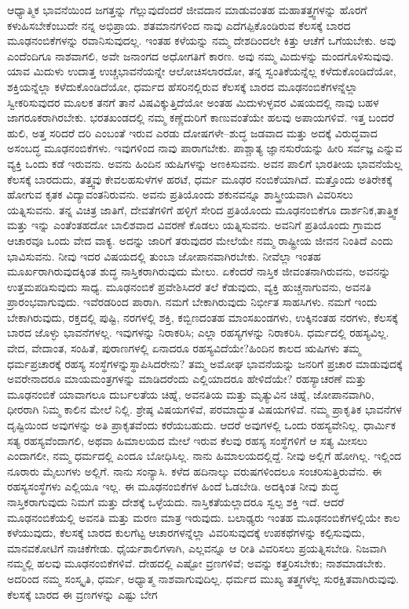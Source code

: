 ಆಧ್ಯಾತ್ಮಿಕ ಭಾವನೆಯಿಂದ ಜಗತ್ತನ್ನು ಗೆಲ್ಲುವುದೆಂದರೆ ಜೀವದಾನ ಮಾಡುವಂತಹ ಮಹಾತತ್ತ್ವಗಳನ್ನು ಹೊರಗೆ ಕಳುಹಿಸಬೇಕೆಂಬುದೇ ನನ್ನ ಅಭಿಪ್ರಾಯ. ಶತಮಾನಗಳಿಂದ ನಾವು ಎದೆಗಪ್ಪಿಕೊಂಡಿರುವ ಕೆಲಸಕ್ಕೆ ಬಾರದ ಮೂಢನಂಬಿಕೆ\-ಗಳನ್ನು ರವಾನಿಸುವುದಲ್ಲ. ಇಂತಹ ಕಳೆಯನ್ನು ನಮ್ಮ ದೇಶದಿಂದಲೇ ಕಿತ್ತು ಆಚೆಗೆ ಒಗೆಯಬೇಕು. ಅವು ಎಂದೆಂದಿಗೂ ನಾಶವಾಗಲಿ, ಅವೇ ಜನಾಂಗದ ಅಧೋಗತಿಗೆ ಕಾರಣ. ಅವು ನಮ್ಮ ಮಿದುಳನ್ನು ಮಂದಗೊಳಿಸುವುವು. ಯಾವ ಮಿದುಳು ಉದಾತ್ತ ಉಚ್ಚಭಾವನೆಯನ್ನೇ ಆಲೋಚಿಸಲಾರದೋ, ತನ್ನ ಸ್ವಂತಿಕೆಯನ್ನೆಲ್ಲ ಕಳೆದುಕೊಂಡಿದೆಯೋ, ಶಕ್ತಿಯನ್ನೆಲ್ಲಾ ಕಳೆದುಕೊಂಡಿದೆಯೋ, ಧರ್ಮದ ಹೆಸರಿನಲ್ಲಿರುವ ಕೆಲಸಕ್ಕೆ ಬಾರದ ಮೂಢನಂಬಿಕೆಗಳನ್ನೆಲ್ಲಾ ಸ್ವೀಕರಿಸುವುದರ ಮೂಲಕ ತನಗೆ ತಾನೆ ವಿಷವಿಕ್ಕುತ್ತಿದೆಯೋ ಅಂತಹ ಮಿದುಳುಳ್ಳವರ ವಿಷಯದಲ್ಲಿ ನಾವು ಬಹಳ ಜಾಗರೂಕರಾಗಿರಬೇಕು. ಭರತಖಂಡದಲ್ಲಿ ನಮ್ಮ ಕಣ್ಣೆದುರಿಗೆ ಕಾಣುವಂತೆಯೇ ಹಲವು ಅಪಾಯಗಳಿವೆ. ಇತ್ತ ಬಂದರೆ ಹುಲಿ, ಅತ್ತ ಸರಿದರೆ ದರಿ ಎಂಬಂತೆ ಇರುವ ಎರಡು ದೋಷಗಳೇ–ಶುದ್ಧ ಜಡವಾದ ಮತ್ತು ಅದಕ್ಕೆ ವಿರುದ್ಧವಾದ ಅಸಂಬದ್ಧ ಮೂಢನಂಬಿಕೆಗಳು. ಇವುಗಳಿಂದ ನಾವು ಪಾರಾಗಬೇಕು. ಪಾಶ್ಚಾತ್ಯ ಜ್ಞಾನಸುರೆಯನ್ನು ಹೀರಿ ಸರ್ವಜ್ಞ ಎನ್ನುವ ವ್ಯಕ್ತಿ ಒಂದು ಕಡೆ ಇರುವನು. ಅವನು ಹಿಂದಿನ ಋಷಿಗಳನ್ನು ಅಣಕಿಸುವನು. ಅವನ ಪಾಲಿಗೆ ಭಾರತೀಯ ಭಾವನೆಯೆಲ್ಲ ಕೆಲಸಕ್ಕೆ ಬಾರದುದು, ತತ್ತ್ವವು ಕೇವಲ\break ಹಸುಳೆಗಳ ಹರಟೆ, ಧರ್ಮ ಮೂಢರ ನಂಬಿಕೆಯಾಗಿದೆ. ಮತ್ತೊಂದು ಅತಿರೇಕಕ್ಕೆ ಹೋಗುವ ಕೃತಕ ವಿದ್ಯಾವಂತನಿರುವನು. ಅವನು ಪ್ರತಿಯೊಂದು ಶಕುನ\-ವನ್ನೂ ಶಾಸ್ತ್ರೀಯವಾಗಿ ವಿವರಿಸಲು ಯತ್ನಿಸುವನು. ತನ್ನ ವಿಚಿತ್ರ ಜಾತಿಗೆ, ದೇವತೆಗಳಿಗೆ ಹಳ್ಳಿಗೆ ಸೇರಿದ ಪ್ರತಿಯೊಂದು ಮೂಢನಂಬಿಕೆಗೂ ದಾರ್ಶನಿಕ,\break ತಾತ್ತ್ವಿಕ ಮತ್ತು ಇನ್ನು ಎಂತೆಂತಹದೋ ಬಾಲಿಶವಾದ ವಿವರಣೆ ಕೊಡಲು ಯತ್ನಿಸು\-ವನು. ಅವನಿಗೆ ಪ್ರತಿಯೊಂದು ಗ್ರಾಮದ ಆಚಾರವೂ ಒಂದು ವೇದ ವಾಕ್ಯ. ಅದನ್ನು ಜಾರಿಗೆ ತರುವುದರ ಮೇಲೆಯೇ ನಮ್ಮ ರಾಷ್ಟ್ರೀಯ ಜೀವನ ನಿಂತಿದೆ ಎಂದು ಭಾವಿಸುವನು. ನೀವು ಇದರ ವಿಷಯದಲ್ಲಿ ತುಂಬಾ ಜೋಪಾನವಾಗಿರಬೇಕು. ನೀವೆಲ್ಲಾ ಇಂತಹ ಮೂರ್ಖರಾಗಿರುವುದಕ್ಕಿಂತ ಶುದ್ಧ ನಾಸ್ತಿಕ\-ರಾಗಿರುವುದು ಮೇಲು. ಏಕೆಂದರೆ ನಾಸ್ತಿಕ ಜೀವಂತನಾಗಿರುವನು, ಅವನನ್ನು ಉತ್ತಮಪಡಿಸುವುದು ಸಾಧ್ಯ. ಮೂಢನಂಬಿಕೆ ಪ್ರವೇಶಿಸಿದರೆ ತಲೆ ಕೆಡುವುದು, ವ್ಯಕ್ತಿ ಹುಚ್ಚನಾಗುವನು, ಅವನತಿ ಪ್ರಾರಂಭವಾಗುವುದು. ಇವೆರಡರಿಂದ ಪಾರಾಗಿ. ನಮಗೆ ಬೇಕಾಗಿರುವುದು ನಿರ್ಭೀತ ಸಾಹಸಿಗಳು. ನಮಗೆ ಇಂದು ಬೇಕಾಗಿರುವುದು, ರಕ್ತದಲ್ಲಿ ಪುಷ್ಟಿ, ನರಗಳಲ್ಲಿ ಶಕ್ತಿ, ಕಬ್ಬಿಣದಂತಹ ಮಾಂಸಖಂಡಗಳು, ಉಕ್ಕಿನಂತಹ ನರಗಳು, ಕೆಲಸಕ್ಕೆ ಬಾರದ ಜೊಳ್ಳು ಭಾವನೆಗಳಲ್ಲ. ಇವುಗಳನ್ನು ನಿರಾಕರಿಸಿ; ಎಲ್ಲಾ ರಹಸ್ಯಗಳನ್ನು ನಿರಾಕರಿಸಿ. ಧರ್ಮದಲ್ಲಿ ರಹಸ್ಯವಿಲ್ಲ. ವೇದ, ವೇದಾಂತ, ಸಂಹಿತೆ, ಪುರಾಣಗಳಲ್ಲಿ ಏನಾದರೂ ರಹಸ್ಯವಿದೆಯೇ?\break ಹಿಂದಿನ ಕಾಲದ ಋಷಿಗಳು ತಮ್ಮ ಧರ್ಮಪ್ರಚಾರಕ್ಕೆ ರಹಸ್ಯ ಸಂಸ್ಥೆಗಳನ್ನು\break ಸ್ಥಾಪಿಸಿದರೇನು? ತಮ್ಮ ಅಮೋಘ ಭಾವನೆಯನ್ನು ಜನರಿಗೆ ಪ್ರಚಾರ ಮಾಡುವುದಕ್ಕೆ ಅವರೇನಾದರೂ ಮಾಯಮಂತ್ರಗಳನ್ನು ಮಾಡಿದರೆಂದು ಎಲ್ಲಿಯಾದರೂ ಹೇಳಿದೆಯೇ? ರಹಸ್ಯಾಚರಣೆ ಮತ್ತು ಮೂಢನಂಬಿಕೆ ಯಾವಾಗಲೂ ದುರ್ಬಲತೆಯ ಚಿಹ್ನೆ, ಅವನತಿಯ ಮತ್ತು ಮೃತ್ಯುವಿನ ಚಿಹ್ನೆ, ಜೋಪಾನವಾಗಿರಿ, ಧೀರರಾಗಿ ನಿಮ್ಮ ಕಾಲಿನ ಮೇಲೆ ನಿಲ್ಲಿ. ಶ್ರೇಷ್ಠ ವಿಷಯಗಳಿವೆ, ಪರಮಾದ್ಭುತ ವಿಷಯಗಳಿವೆ. ನಮ್ಮ ಪ್ರಾಕೃತಿಕ ಭಾವನೆಗಳ ದೃಷ್ಟಿಯಿಂದ ಅವುಗಳನ್ನು ಅತಿ ಪ್ರಾಕೃತವೆಂದು ಕರೆಯಬಹುದು. ಆದರೆ ಅವುಗಳಲ್ಲಿ ಒಂದು ರಹಸ್ಯವೇನಿಲ್ಲ. ಧಾರ್ಮಿಕ ಸತ್ಯ ರಹಸ್ಯವೆಂದಾಗಲಿ, ಅಥವಾ ಹಿಮಾಲಯದ ಮೇಲೆ ಇರುವ ಕೆಲವು ರಹಸ್ಯ ಸಂಸ್ಥೆಗಳಿಗೆ ಆ ಸತ್ಯ ಮೀಸಲು ಎಂದಾಗಲೀ, ನಮ್ಮ ಧರ್ಮದಲ್ಲಿ ಎಂದೂ ಬೋಧಿಸಿಲ್ಲ. ನಾನು ಹಿಮಾಲಯದಲ್ಲಿದ್ದೆ. ನೀವು ಅಲ್ಲಿಗೆ ಹೋಗಿಲ್ಲ. ಇಲ್ಲಿಂದ ನೂರಾರು ಮೈಲುಗಳು ಅಲ್ಲಿಗೆ. ನಾನು ಸಂನ್ಯಾಸಿ. ಕಳೆದ ಹದಿನಾಲ್ಕು ವರುಷಗಳಿಂದಲೂ ಸಂಚರಿಸುತ್ತಿರುವೆನು. ಈ ರಹಸ್ಯಸಂಸ್ಥೆಗಳು ಎಲ್ಲಿಯೂ ಇಲ್ಲ. ಈ ಮೂಢನಂಬಿಕೆಗಳ ಹಿಂದೆ ಓಡಬೇಡಿ. ಅದಕ್ಕಿಂತ ನೀವು ಶುದ್ಧ ನಾಸ್ತಿಕರಾಗುವುದು ನಿಮಗೆ ಮತ್ತು ದೇಶಕ್ಕೆ ಒಳ್ಳೆಯದು. ನಾಸ್ತಿಕತೆಯಲ್ಲಾದರೂ ಸ್ವಲ್ಪ ಶಕ್ತಿ ಇದೆ. ಆದರೆ ಮೂಢನಂಬಿಕೆಯಲ್ಲಿ ಅವನತಿ ಮತ್ತು ಮರಣ ಮಾತ್ರ ಇರುವುದು. ಬಲಾಢ್ಯರು ಇಂತಹ ಮೂಢನಂಬಿಕೆಗಳಲ್ಲಿಯೇ ಕಾಲ ಕಳೆಯುವುದು, ಕೆಲಸಕ್ಕೆ ಬಾರದ ಕುಲಗೆಟ್ಟ ಆಚಾರಗಳನ್ನೆಲ್ಲಾ ವಿವರಿಸುವುದಕ್ಕೆ ಉಪಕಥೆಗಳನ್ನು ಕಲ್ಪಿಸುವುದು, ಮಾನವಕೋಟಿಗೆ ನಾಚಿಕೆಗೇಡು. ಧೈರ್ಯಶಾಲಿಗಳಾಗಿ, ಎಲ್ಲವನ್ನೂ ಆ ರೀತಿ ವಿವರಿಸಲು ಪ್ರಯತ್ನಿಸಬೇಡಿ. ನಿಜವಾಗಿ ನಮ್ಮಲ್ಲಿ ಹಲವು ಮೂಢನಂಬಿಕೆಗಳಿವೆ. ದೇಹದಲ್ಲಿ ಎಷ್ಟೋ ವ್ರಣಗಳಿವೆ; ಅವನ್ನು ಕತ್ತರಿಸಬೇಕು; ನಾಶಮಾಡಬೇಕು. ಅದರಿಂದ ನಮ್ಮ ಸಂಸ್ಕೃತಿ, ಧರ್ಮ, ಅಧ್ಯಾತ್ಮ ನಾಶವಾಗುವುದಿಲ್ಲ. ಧರ್ಮದ ಮುಖ್ಯ ತತ್ತ್ವಗಳೆಲ್ಲ ಸುರಕ್ಷಿತವಾಗಿರುವುವು. ಕೆಲಸಕ್ಕೆ ಬಾರದ ಈ ವ್ರಣಗಳನ್ನು ಎಷ್ಟು ಬೇಗ 